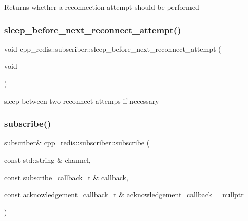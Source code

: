 \begin{DoxyReturn}{Returns}
whether a reconnection attempt should be performed 
\end{DoxyReturn}
\mbox{\label{classcpp__redis_1_1subscriber_aa4a227745820990bfed151f51376ac54}} 
\subsubsection{\texorpdfstring{sleep\+\_\+before\+\_\+next\+\_\+reconnect\+\_\+attempt()}{sleep\_before\_next\_reconnect\_attempt()}}
{\footnotesize\ttfamily void cpp\+\_\+redis\+::subscriber\+::sleep\+\_\+before\+\_\+next\+\_\+reconnect\+\_\+attempt (\begin{DoxyParamCaption}\item[{void}]{ }\end{DoxyParamCaption})\hspace{0.3cm}{\ttfamily [private]}}

sleep between two reconnect attemps if necessary \mbox{\label{classcpp__redis_1_1subscriber_afee579c702182041645a3d3c55de4b9e}} 
\subsubsection{\texorpdfstring{subscribe()}{subscribe()}}
{\footnotesize\ttfamily \hyperlink{classcpp__redis_1_1subscriber}{subscriber}\& cpp\+\_\+redis\+::subscriber\+::subscribe (\begin{DoxyParamCaption}\item[{const std\+::string \&}]{channel,  }\item[{const \hyperlink{classcpp__redis_1_1subscriber_ac6ab8ebc526d784e4b79a39bbd73dca8}{subscribe\+\_\+callback\+\_\+t} \&}]{callback,  }\item[{const \hyperlink{classcpp__redis_1_1subscriber_a19ea39dfabeb19937a9ce4c8d21781b4}{acknowledgement\+\_\+callback\+\_\+t} \&}]{acknowledgement\+\_\+callback = {\ttfamily nullptr} }\end{DoxyParamCaption})}

